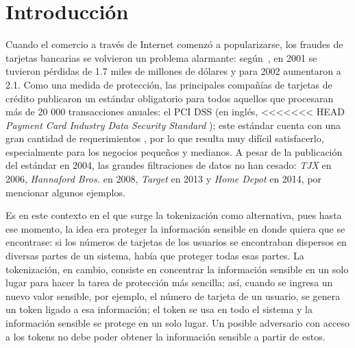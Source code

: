 %
%

\section{Introducción}


Cuando el comercio a través de Internet comenzó a popularizarse, los fraudes de
tarjetas bancarias se volvieron un problema alarmante: según~\cite{wallethub},
en 2001 se tuvieron pérdidas de 1.7 miles de millones de dólares y para 2002
aumentaron a 2.1. Como una medida de protección, las principales compañías de
tarjetas de crédito publicaron un estándar obligatorio para todos aquellos que
procesaran más de 20 000 transacciones anuales: el PCI DSS (en inglés,
<<<<<<< HEAD
\textit{Payment Card Industry Data Security Standard} \cite{pci_dss}); este
estándar cuenta con una gran cantidad de requerimientos \cite{search_security,
uk_association}, por lo que resulta muy difícil satisfacerlo, 
especialmente para los negocios pequeños y medianos. A pesar de la publicación
del estándar en 2004, las grandes filtraciones de datos no han cesado:
\textit{TJX} en 2006, \textit{Hannaford Bros.} en 2008, \textit{Target} en
2013 y \textit{Home Depot} en 2014, por mencionar algunos ejemplos.


Es en este contexto en el que surge la tokenización como alternativa, pues hasta
ese momento, la idea era proteger la información sensible en donde
quiera que se encontrase: si los números de tarjetas de los usuarios se
encontraban dispersos en diversas partes de un sistema, había que proteger todas
esas partes. La tokenización, en cambio, consiste en concentrar la información
sensible en un solo lugar para hacer la tarea de protección más sencilla; así,
cuando se ingresa un nuevo valor sensible, por ejemplo, el número de tarjeta
de un usuario, se genera un token ligado a esa información; el token se usa en
todo el sistema y la información sensible se protege en un solo lugar. Un
posible adversario con acceso a los tokens no debe poder obtener la información
sensible a partir de estos.

